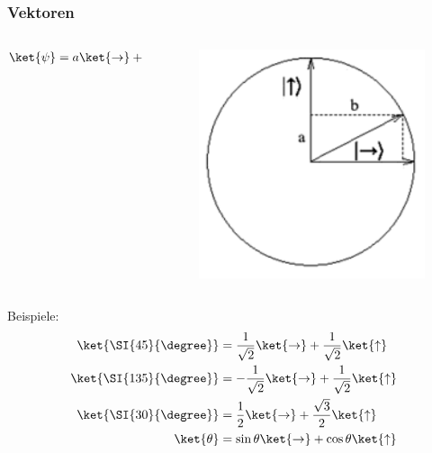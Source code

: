 \documentclass{beamer}
\begin{document}
\begin{frame}
    \frametitle{Vektoren}
    \begin{columns}
        \begin{column}{5cm}
            \begin{align*}
                \ket{\psi} &= a\ket{\to} + b\ket{\uparrow}
            \end{align*}
        \end{column}
        \begin{column}{5cm}
            \begin{figure}
                \centering
                \includegraphics[height=0.33\textheight]{fig24.png}
                \label{fig24}
            \end{figure}
        \end{column}
\end{columns}

Beispiele:
\begin{align*}
    \ket{\SI{45}{\degree}} &= \frac{1}{\sqrt2}\ket{\to} + \frac{1}{\sqrt2}\ket{\uparrow}
    \\
    \ket{\SI{135}{\degree}} &= -\frac{1}{\sqrt2}\ket{\to} + \frac{1}{\sqrt2}\ket{\uparrow}
    \\
    \ket{\SI{30}{\degree}} &= \frac{1}{2}\ket{\to} + \frac{\sqrt3}{2}\ket{\uparrow}
    \\
    \ket{\theta} &= \sin\theta\ket{\to} + \cos\theta\ket{\uparrow}
\end{align*}
\end{frame}
\end{document}
